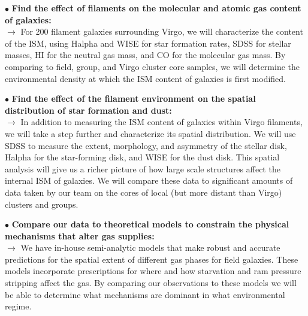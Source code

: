 \documentclass[11pt, preprint]{aastex}
\begin{document}
\noindent $\bullet$ \textbf{Find the effect of filaments on the molecular and atomic gas content of galaxies:}\\ $\rightarrow$ 
For 200 filament galaxies surrounding Virgo, we will characterize the
content of the ISM, using Halpha and WISE for star formation rates,
SDSS for stellar masses, HI for the neutral gas mass, and CO for the
molecular gas mass. By comparing to field, group, and Virgo cluster
core samples, we will determine the environmental density at which the
ISM content of galaxies is first modified.
%
  
\noindent $\bullet$ \textbf{Find the effect of the filament
  environment on the spatial distribution of star formation and
  dust:}\\ $\rightarrow$
In addition to measuring the ISM content of galaxies within Virgo filaments, we will take a step further and characterize its spatial distribution. We will use SDSS to measure the extent, morphology, and asymmetry of the stellar disk, Halpha for the star-forming disk, and WISE for the dust disk. This spatial analysis will give us a richer picture of how large scale structures affect the internal ISM of galaxies. We will compare these data to significant amounts of data taken by our team on the cores of local (but more distant than Virgo) clusters and groups. 
  
\noindent $\bullet$ \textbf{Compare our data to theoretical models to
  constrain the physical mechanisms that alter gas supplies:}\\
$\rightarrow$ 
We have in-house semi-analytic models that make robust and accurate predictions for the spatial extent of different gas phases for field galaxies. These models incorporate prescriptions for where and how starvation and ram pressure stripping affect the gas. By comparing our observations to these models we will be able to determine what mechanisms are dominant in what environmental regime. 
\end{document}
